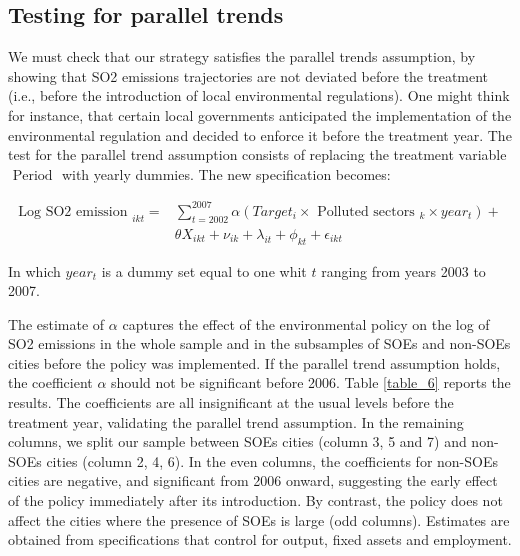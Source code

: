 \documentclass[12pt]{article}
\begin{document}
\subsection{Testing for parallel trends}

We must check that our strategy satisfies the parallel trends assumption, by showing that SO2 emissions trajectories are not deviated before the treatment (i.e., before the introduction of local environmental regulations). One might think for instance, that certain local governments anticipated the implementation of the environmental regulation and decided to enforce it before the treatment year. The test for the parallel trend assumption consists of replacing the treatment variable $\text { Period }$ with yearly dummies. The new specification becomes:

\begin{equation} \label{eq:equation_3}
\begin{aligned}
 \text {Log SO2 emission }_{i k t}= & \sum_{t=2002}^{2007} \alpha (Target_{i}  \times \text { Polluted sectors }_{k} \times year _{t}) + \\
 & \theta {X}_{i k t}+\nu_{ik}+\lambda_{it} +\phi_{kt} +\epsilon_{ikt}
 \end{aligned}
\end{equation}

In which $year_t$ is a dummy set equal to one whit $t$ ranging from years 2003 to 2007. 


The estimate of $\alpha$ captures the effect of the environmental policy on the log of SO2 emissions in the whole sample and in the subsamples of SOEs and non-SOEs cities before the policy was implemented. If the parallel trend assumption holds, the coefficient $\alpha$ should not be significant before 2006. Table \ref{table_6} reports the results. The coefficients are all insignificant at the usual levels before the treatment year, validating the parallel trend assumption. In the remaining columns, we split our sample between SOEs cities (column 3, 5 and 7) and non-SOEs cities (column 2, 4, 6). In the even columns, the coefficients for non-SOEs cities are negative, and significant from 2006 onward, suggesting the early effect of the policy immediately after its introduction. By contrast, the policy does not affect the cities where the presence of SOEs is large (odd columns). Estimates are obtained from specifications that control for output, fixed assets and employment.
\end{document}
